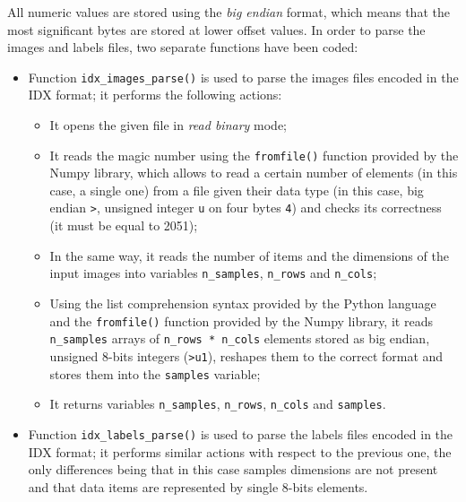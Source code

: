 \documentclass[letterpaper,headings=standardclasses]{scrartcl}
\begin{document}
All numeric values are stored using the \emph{big endian} format, which means that the most significant bytes are stored at lower offset values. In order to parse the images and labels files, two separate functions have been coded:

\begin{itemize}

\item Function \texttt{idx\_images\_parse()} is used to parse the images files encoded in the IDX format; it performs the following actions:

\begin{itemize}

\item It opens the given file in \emph{read binary} mode;

\item It reads the magic number using the \texttt{fromfile()} function provided by the Numpy library, which allows to read a certain number of elements (in this case, a single one) from a file given their data type (in this case, big endian \texttt{>}, unsigned integer \texttt{u} on four bytes \texttt{4}) and checks its correctness (it must be equal to 2051);

\item In the same way, it reads the number of items and the dimensions of the input images into variables \texttt{n\_samples}, \texttt{n\_rows} and \texttt{n\_cols};

\item Using the list comprehension syntax provided by the Python language and the \texttt{fromfile()} function provided by the Numpy library, it reads \texttt{n\_samples} arrays of \texttt{n\_rows * n\_cols} elements stored as big endian, unsigned 8-bits integers (\texttt{>u1}), reshapes them to the correct format and stores them into the \texttt{samples} variable;

\item It returns variables \texttt{n\_samples}, \texttt{n\_rows}, \texttt{n\_cols} and \texttt{samples}.

\end{itemize}

\item Function \texttt{idx\_labels\_parse()} is used to parse the labels files encoded in the IDX format; it performs similar actions with respect to the previous one, the only differences being that in this case samples dimensions are not present and that data items are represented by single 8-bits elements.

\end{itemize}
\end{document}
